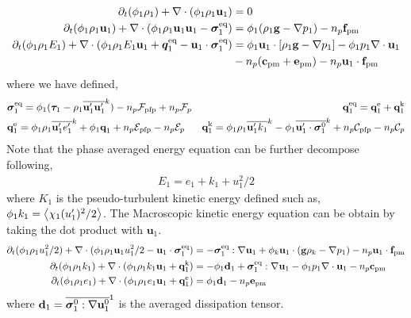 \begin{align}
    \partial_t (\phi_1 \rho_1)  
    + \mathbf{\nabla}\cdot (
        \phi_1 \rho_1\textbf{u}_1
    )
    &= 
    0\\
    \partial_t (\phi_1 \rho_1\textbf{u}_1)  
    + \mathbf{\nabla}\cdot (
        \phi_1 \rho_1\textbf{u}_1\textbf{u}_1
        - \bm{\sigma}_1^\text{eq}
    )
    &= 
    \phi_1  (\rho_1\textbf{g} - \mathbf{\nabla} p_1 )
    - n_p \textbf{f}_\text{pm}\\
    \partial_t (\phi_1\rho_1E_1)  
    + \mathbf{\nabla}\cdot (
        \phi_1\rho_1E_1\textbf{u}_1
        + \bm{q}_1^\text{eq}
        - \textbf{u}_1 \cdot \bm{\sigma}_1^\text{eq}
        )
    &= 
    \phi_1 \textbf{u}_1 \cdot [\rho_1 \textbf{g} 
    - \mathbf{\nabla} p_1 ] - \phi_1 p_1 \mathbf{\nabla}\cdot \textbf{u}_1\\
    & - n_p (\textbf{c}_\text{pm}
    + \textbf{e}_\text{pm})
    - n_p \textbf{u}_1 \cdot \textbf{f}_\text{pm}
\end{align} 
where we have defined, 
\begin{align*}
    &\bm{\sigma}_1^\text{eq}
    = \phi_1(
        \bm{\tau}_1%
        - \rho_1 
        \kavg{\textbf{u}_1'\textbf{u}_1'})
        - n_p \mathcal{F}_\text{pfp} + n_p \mathcal{F}_p
    &\textbf{q}_1^\text{eq}
    =\textbf{q}_1^\text{e} 
    +\textbf{q}_1^\text{k}  
    \\
    &\textbf{q}_1^\text{e}
    = \phi_1\rho_1 \kavg{\textbf{u}_1' e_1'} 
    + \phi_1 \textbf{q}_1
    + n_p \mathcal{E}_\text{pfp} 
    - n_p \mathcal{E}_p 
    &\textbf{q}_1^\text{k}
    = \phi_1\rho_1 \kavg{\textbf{u}_1' k_1} 
    - \phi_1\kavg{\textbf{u}_1' \cdot \bm{\sigma}_1^0} 
    + n_p \mathcal{C}_\text{pfp} 
    - n_p \mathcal{C}_p 
\end{align*}
Note that the phase averaged energy equation can be further decompose following, 
\begin{align*}
    E_1 = e_1 + k_1 + u_1^2/2
\end{align*}
where $K_1$ is the pseudo-turbulent kinetic energy defined such as, $\phi_1 k_1 = \left<\chi_1 (u_1')^2/2\right>$. 
The Macroscopic kinetic energy equation can be obtain by taking the dot product with $\textbf{u}_1$. 
\begin{align}
    \partial_t (\phi_1 \rho_1u_1^2/2)  
    + \mathbf{\nabla}\cdot (
        \phi_1 \rho_1\textbf{u}_1u_1^2/2
        - \textbf{u}_1 \cdot \bm{\sigma}_1^\text{eq}
    )
    &= 
    - \bm{\sigma}_1^\text{eq}  : \mathbf{\nabla} \textbf{u}_1
    + \phi_k \textbf{u}_1 \cdot (\textbf{g} \rho_k - \mathbf{\nabla} p_1 )
    -  n_p \textbf{u}_1\cdot \textbf{f}_\text{pm}\\
    \partial_t (\phi_1\rho_1k_1)  
    + \mathbf{\nabla}\cdot (
        \phi_1\rho_1k_1\textbf{u}_1
        + \textbf{q}_1^\text{k} 
        )
    &= 
    - \phi_1 \textbf{d}_1 
    + \bm{\sigma}_1^\text{eq} : \mathbf{\nabla} \textbf{u}_1
    - \phi_1 p_1  \mathbf{\nabla}\cdot\textbf{u}_1
    -n_p  \textbf{c}_\text{pm}\\
    \partial_t (\phi_1\rho_1e_1)  
    + \mathbf{\nabla}\cdot (
        \phi_1 \rho_1e_1\textbf{u}_1
        +
        \textbf{q}_1^\text{e} 
        )
    &= 
    \phi_1 \textbf{d}_1 
    - n_p \textbf{e}_\text{pm}
\end{align}
where $\textbf{d}_1 = \overline{\bm{\sigma}_1^0 : \mathbf{\nabla} \textbf{u}_1^0}^1$ is the averaged dissipation tensor. 
